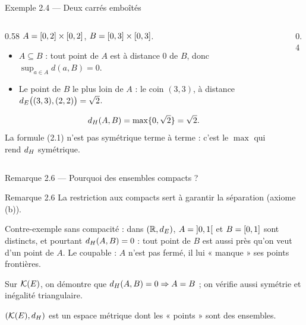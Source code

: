 \begin{frame}{Exemple 2.4 --- Deux carrés emboîtés}
  \begin{columns}[c]
    \begin{column}{0.58\textwidth}
      \small $A=\mathopen{[}{0},{2}\mathclose{]}\times\mathopen{[}{0},{2}\mathclose{]}$,
      $B=\mathopen{[}{0},{3}\mathclose{]}\times\mathopen{[}{0},{3}\mathclose{]}$.
      \begin{itemize}
        \item $A\subseteq B$ : tout point de $A$ est à distance $0$ de
          $B$, donc $\sup_{a\in A}d(a,B)=0$.
        \item Le point de $B$ le plus loin de $A$ : le coin $(3,3)$, à
          distance $d_E\big((3,3),(2,2)\big)=\sqrt2$.
      \end{itemize}
      \[
        d_H(A,B) = \max\{0,\sqrt2\} = \sqrt2.
      \]
      \scriptsize La formule (2.1) n'est pas symétrique terme à
      terme : c'est le $\max$ qui rend $d_H$ symétrique.
    \end{column}
    \begin{column}{0.4\textwidth}
    \end{column}
  \end{columns}
\end{frame}

\begin{frame}{Remarque 2.6 --- Pourquoi des ensembles compacts ?}
  \begin{Rem}{Remarque 2.6}
    \small La restriction aux compacts sert à garantir la
    séparation (axiome (b)).
    \vspace{4pt}

    Contre-exemple sans compacité : dans $(\operatorname{\mathbb{R}},d_E)$,
    $A=\mathopen{]}{0},{1}\mathclose{[}$ et $B=\mathopen{[}{0},{1}\mathclose{]}$ sont distincts, et pourtant
    $d_H(A,B)=0$ : tout point de $B$ est aussi près qu'on veut d'un
    point de $A$. Le coupable : $A$ n'est pas fermé, il lui « manque »
    ses points frontières.
    \vspace{4pt}

    Sur $\mathcal{K}(E)$, on démontre que $d_H(A,B)=0 \Rightarrow A=B$ ; on
    vérifie aussi symétrie et inégalité triangulaire.
  \end{Rem}
  \vspace{4pt}
  \begin{center}
    $(\mathcal{K}(E),d_H)$ est un espace métrique dont les « points »
    sont des ensembles.
  \end{center}
\end{frame}

